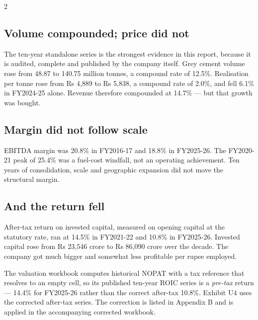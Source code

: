 \begin{paracol}{2}
\subsection{Volume compounded; price did not}

The ten-year standalone series is the strongest evidence in this report, because it
is audited, complete and published by the company itself. Grey cement volume rose
from 48.87 to 140.75 million tonnes, a compound rate of 12.5\%. Realisation per tonne
rose from Rs 4,889 to Rs 5,838, a compound rate of 2.0\%, and fell 6.1\% in
FY2024-25 alone. Revenue therefore compounded at 14.7\% — but that growth was bought.

\subsection{Margin did not follow scale}

EBITDA margin was 20.8\% in FY2016-17 and 18.8\% in FY2025-26. The FY2020-21 peak of
25.4\% was a fuel-cost windfall, not an operating achievement. Ten years of
consolidation, scale and geographic expansion did not move the structural margin.

\subsection{And the return fell}

After-tax return on invested capital, measured on opening capital at the statutory
rate, ran at 14.5\% in FY2021-22 and 10.8\% in FY2025-26. Invested capital rose from
Rs 23,546 crore to Rs 86,090 crore over the decade. The company got much bigger and
somewhat less profitable per rupee employed.

\begin{warnbox}
The valuation workbook computes historical NOPAT with a tax reference that resolves
to an empty cell, so its published ten-year ROIC series is a \emph{pre-tax} return —
14.4\% for FY2025-26 rather than the correct after-tax 10.8\%. Exhibit U4 uses the
corrected after-tax series. The correction is listed in Appendix B and is applied in
the accompanying corrected workbook.
\end{warnbox}

\switchcolumn
{}


\end{paracol}

